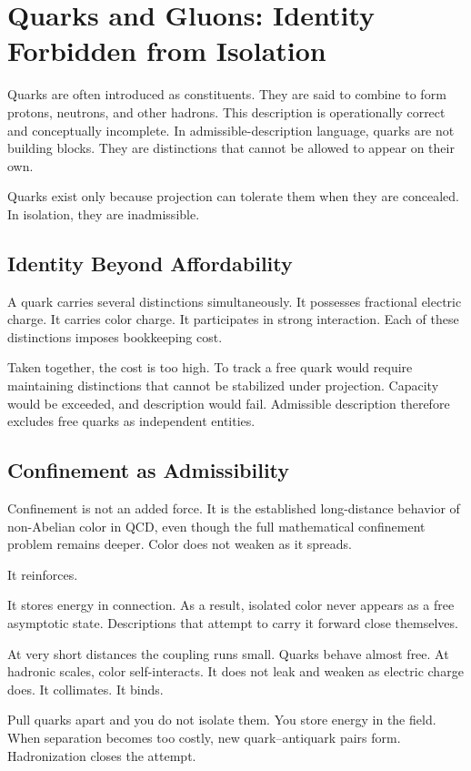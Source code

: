 \documentclass[11pt,twoside,openright]{book}
\begin{document}
\chapter{Quarks and Gluons: Identity Forbidden from Isolation}

Quarks are often introduced as constituents. They are said to combine to form protons, neutrons, and other hadrons. This description is operationally correct and conceptually incomplete. In admissible-description language, quarks are not building blocks. They are distinctions that cannot be allowed to appear on their own.

Quarks exist only because projection can tolerate them when they are concealed. In isolation, they are inadmissible.

\section*{Identity Beyond Affordability}

A quark carries several distinctions simultaneously. It possesses fractional electric charge. It carries color charge. It participates in strong interaction. Each of these distinctions imposes bookkeeping cost.

Taken together, the cost is too high. To track a free quark would require maintaining distinctions that cannot be stabilized under projection. Capacity would be exceeded, and description would fail. Admissible description therefore excludes free quarks as independent entities.

\section*{Confinement as Admissibility}

Confinement is not an added force. It is the established long-distance behavior of non-Abelian color in QCD, even though the full mathematical confinement problem remains deeper. Color does not weaken as it spreads.

It reinforces.

It stores energy in connection. As a result, isolated color never appears as a free asymptotic state. Descriptions that attempt to carry it forward close themselves.

At very short distances the coupling runs small. Quarks behave almost free. At hadronic scales, color self-interacts. It does not leak and weaken as electric charge does. It collimates. It binds.

Pull quarks apart and you do not isolate them. You store energy in the field. When separation becomes too costly, new quark--antiquark pairs form. Hadronization closes the attempt.
\end{document}
